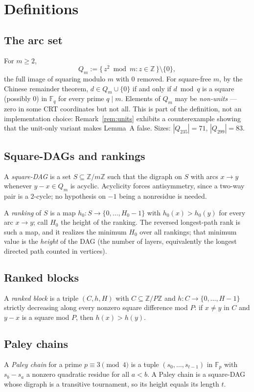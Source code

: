 \documentclass[11pt]{amsart}
\theoremstyle{plain}
\theoremstyle{remark}
\newcommand{\Z}{\mathbb{Z}}
\newcommand{\F}{\mathbb{F}}
\begin{document}
\section{Definitions}\label{sec:defs}

\subsection*{The arc set}
For $m \ge 2$,
\[
Q_m := \{\, z^2 \bmod m : z \in \Z \,\} \setminus \{0\},
\]
the full image of squaring modulo $m$ with $0$ removed. For square-free $m$,
by the Chinese remainder theorem, $d \in Q_m \cup \{0\}$ if and only if
$d \bmod q$ is a square (possibly $0$) in $\F_q$ for every prime $q \mid m$.
Elements of $Q_m$ may be \emph{non-units} --- zero in some CRT coordinates
but not all. This is part of the definition, not an implementation choice:
Remark~\ref{rem:units} exhibits a counterexample showing that the unit-only
variant makes Lemma~A false. Sizes: $|Q_{235}| = 71$, $|Q_{299}| = 83$.

\subsection*{Square-DAGs and rankings}
A \emph{square-DAG} is a set $S \subseteq \Z/m\Z$ such that the digraph on
$S$ with arcs $x \to y$ whenever $y - x \in Q_m$ is acyclic. Acyclicity
forces antisymmetry, since a two-way pair is a $2$-cycle; no hypothesis on
$-1$ being a nonresidue is needed.

A \emph{ranking} of $S$ is a map $h_0 : S \to \{0,\dots,H_0-1\}$ with
$h_0(x) > h_0(y)$ for every arc $x \to y$; call $H_0$ the height of the
ranking. The reversed longest-path rank is such a map, and it realizes the
minimum $H_0$ over all rankings; that minimum value is the \emph{height} of
the DAG (the number of layers, equivalently the longest directed path counted
in vertices).

\subsection*{Ranked blocks}
A \emph{ranked block} is a triple $(C, h, H)$ with $C \subseteq \Z/P\Z$ and
$h : C \to \{0,\dots,H-1\}$ strictly decreasing along every nonzero square
difference mod $P$: if $x \ne y$ in $C$ and $y - x$ is a square mod $P$, then
$h(x) > h(y)$.

\subsection*{Paley chains}
A \emph{Paley chain} \cite[Def.~2]{Krachun} for a prime
$p \equiv 3 \pmod 4$ is a tuple $(s_0,\dots,s_{t-1})$ in $\F_p$ with
$s_b - s_a$ a nonzero quadratic residue for all $a < b$. A Paley chain is a
square-DAG whose digraph is a transitive tournament, so its height equals its
length $t$.
\end{document}
